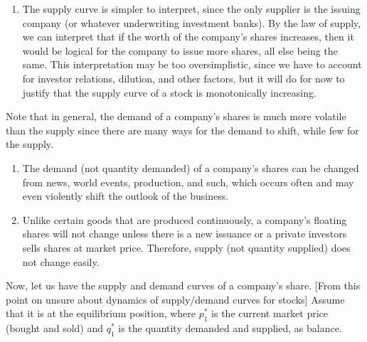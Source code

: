 \documentclass{article}
\begin{document}
\begin{enumerate}
      \item The supply curve is simpler to interpret, since the only supplier is the issuing company (or whatever underwriting investment banks). By the law of supply, we can interpret that if the worth of the company's shares increases, then it would be logical for the company to issue more shares, all else being the same. This interpretation may be too oversimplistic, since we have to account for investor relations, dilution, and other factors, but it will do for now to justify that the supply curve of a stock is monotonically increasing.  
    \end{enumerate}
    Note that in general, the demand of a company's shares is much more volatile than the supply since there are many ways for the demand to shift, while few for the supply. 
    \begin{enumerate}
      \item The demand (not quantity demanded) of a company's shares can be changed from news, world events, production, and such, which occurs often and may even violently shift the outlook of the business. 
      \item Unlike certain goods that are produced continuously, a company's floating shares will not change unless there is a new issuance or a private investors sells shares at market price. Therefore, supply (not quantity supplied) does not change easily. 
    \end{enumerate}
    Now, let us have the supply and demand curves of a company's share. [From this point on unsure about dynamics of supply/demand curves for stocks] Assume that it is at the equilibrium position, where $p^*_1$ is the current market price (bought and sold) and $q_1^*$ is the quantity demanded and supplied, as balance. 
\end{document}
